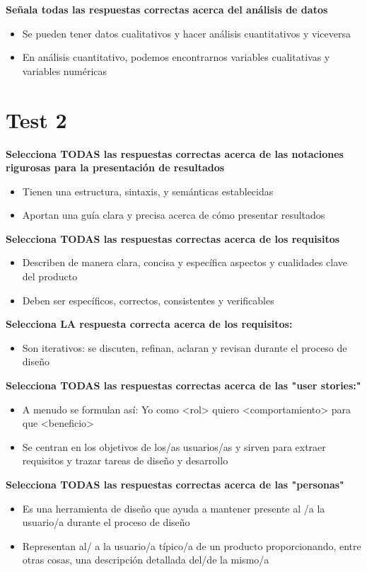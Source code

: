 \documentclass[12pt]{report} %
\begin{document}
\textbf{Señala todas las respuestas correctas acerca del análisis de datos}
\begin{itemize}
  \item Se pueden tener datos cualitativos y hacer análisis cuantitativos y viceversa
  \item En análisis cuantitativo, podemos encontrarnos variables cualitativas y variables numéricas
\end{itemize}

\section{Test 2}

\textbf{Selecciona TODAS las respuestas correctas acerca de las notaciones rigurosas para la presentación de resultados}
\begin{itemize}
  \item Tienen una estructura, sintaxis, y semánticas establecidas
  \item Aportan una guía clara y precisa acerca de cómo presentar resultados
\end{itemize}

\textbf{Selecciona TODAS las respuestas correctas acerca de los requisitos}
\begin{itemize}
  \item Describen de manera clara, concisa y específica aspectos y cualidades clave del producto
  \item Deben ser específicos, correctos, consistentes y verificables
\end{itemize}

\textbf{Selecciona LA respuesta correcta acerca de los requisitos:}
\begin{itemize}
  \item Son iterativos: se discuten, refinan, aclaran y revisan durante el proceso de diseño
\end{itemize}

\textbf{Selecciona TODAS las respuestas correctas acerca de las "user stories:"}
\begin{itemize}
  \item A menudo se formulan así: Yo como <rol> quiero <comportamiento> para que <beneficio>
  \item Se centran en los objetivos de los/as usuarios/as y sirven para extraer requisitos y trazar tareas de diseño y desarrollo
\end{itemize}

\textbf{Selecciona TODAS las respuestas correctas acerca de las "personas"}
\begin{itemize}
  \item Es una herramienta de diseño que ayuda a mantener presente al /a la usuario/a durante el proceso de diseño
  \item Representan al/ a la usuario/a típico/a de un producto proporcionando, entre otras cosas,  una descripción detallada del/de la mismo/a
\end{itemize}
\end{document}
